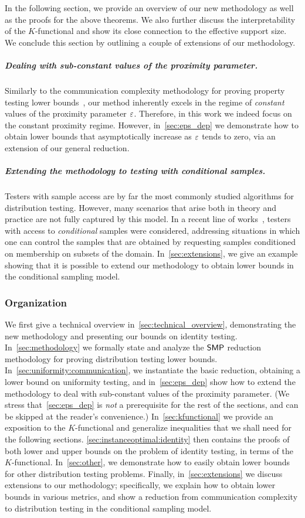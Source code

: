 In the following section, we provide an overview of our new methodology as well as the proofs for the above theorems. We also further discuss the interpretability of the $K$-functional and show its close connection to the effective support size. We conclude this section by outlining a couple of extensions of our methodology.

\subparagraph{Dealing with sub-constant values of the proximity parameter.} Similarly to the communication complexity methodology for proving property testing lower bounds~\cite{BBM:12}, our method inherently excels in the regime of \emph{constant} values of the proximity parameter $\varepsilon$. Therefore, in this work we indeed focus on the constant proximity regime. However, in~\cref{sec:eps_dep} we demonstrate how to obtain lower bounds that asymptotically increase as $\varepsilon$ tends to zero, via an extension of our general reduction.


\subparagraph{Extending the methodology to testing with conditional samples.} Testers with sample access are by far the most commonly studied algorithms for distribution testing. However, many scenarios that arise both in theory and practice are not  fully captured by this model. In a recent line of works~\cite{CFGM:13,CRS:15,ACK:14,FJOPS:15,FLV:16}, testers with access to \emph{conditional} samples were considered, addressing situations in which one can control the samples that are obtained by requesting samples conditioned on membership on subsets of the domain. In~\cref{sec:extensions}, we give an example showing that it is possible to extend our methodology to obtain lower bounds in the conditional sampling model.

\subsubsection{Organization}
We first give a technical overview in~\cref{sec:technical_overview}, demonstrating the new methodology and presenting our bounds on identity testing. %
In~\cref{sec:methodology} we formally state and analyze the $\mathsf{SMP}$ reduction methodology for proving distribution testing lower bounds. In~\cref{sec:uniformity:communication}, we instantiate the basic reduction, obtaining a lower bound on uniformity testing, and in~\cref{sec:eps_dep} show how to extend the methodology to deal with sub-constant values of the proximity parameter. (We stress that~\cref{sec:eps_dep} is \emph{not} a prerequisite for the rest of the sections, and can be skipped at the reader's convenience.) In~\cref{sec:kfunctional} we provide an exposition to the $K$-functional and generalize inequalities that we shall need for the following sections. \cref{sec:instanceoptimal:identity} then contains the proofs of both lower and upper bounds on the problem of identity testing, in terms of the $K$-functional. In~\cref{sec:other}, we demonstrate how to easily obtain lower bounds for other distribution testing problems. Finally, in~\cref{sec:extensions} we discuss extensions to our methodology; specifically, we explain how to obtain lower bounds in various metrics, and show a reduction from communication complexity to distribution testing in the conditional sampling model.

